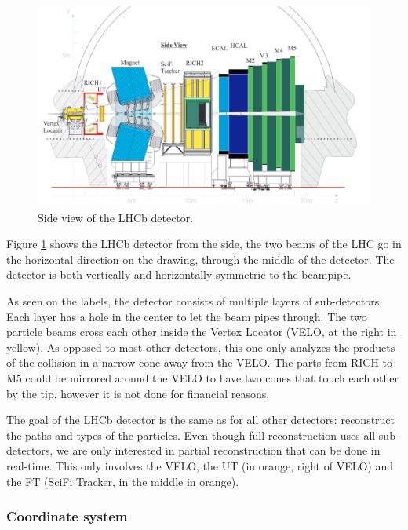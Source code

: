 \documentclass[12pt]{article}
\begin{document}
\begin{figure}[H]
	\includegraphics[width=\textwidth]{lhcb_geometry_upgrade}
	\caption[LHCB detector side view]{Side view of the LHCb detector. \cite{tracker_tdr}}
	\label{fig_lhcb_geometry}
\end{figure}

Figure \ref{fig_lhcb_geometry} shows the LHCb detector from the side, the two beams of the LHC go in the horizontal direction on the drawing, through the middle of the detector. The detector is both vertically and horizontally symmetric to the beampipe.

As seen on the labels, the detector consists of multiple layers of sub-detectors. Each layer has a hole in the center to let the beam pipes through. The two particle beams cross each other inside the Vertex Locator (VELO, at the right in yellow). As opposed to most other detectors, this one only analyzes the products of the collision in a narrow cone away from the VELO. The parts from RICH to M5 could be mirrored around the VELO to have two cones that touch each other by the tip, however it is not done for financial reasons.

The goal of the LHCb detector is the same as for all other detectors: reconstruct the paths and types of the particles. Even though full reconstruction uses all sub-detectors, we are only interested in partial reconstruction that can be done in real-time. This only involves the VELO, the UT (in orange, right of VELO) and the FT (SciFi Tracker, in the middle in orange).

\newpage
\subsubsection{Coordinate system}\label{sec_coordinate_system}
\end{document}
